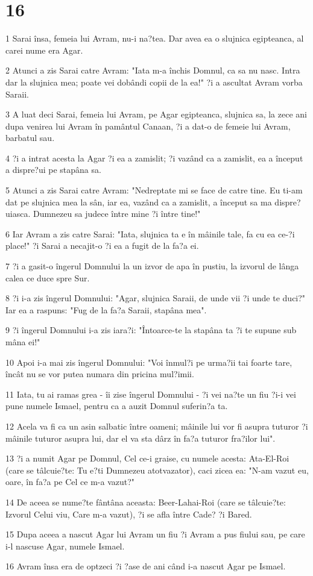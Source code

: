 \chapter{16}

\par 1 Sarai însa, femeia lui Avram, nu-i na?tea. Dar avea ea o slujnica egipteanca, al carei nume era Agar.
\par 2 Atunci a zis Sarai catre Avram: "Iata m-a închis Domnul, ca sa nu nasc. Intra dar la slujnica mea; poate vei dobândi copii de la ea!" ?i a ascultat Avram vorba Saraii.
\par 3 A luat deci Sarai, femeia lui Avram, pe Agar egipteanca, slujnica sa, la zece ani dupa venirea lui Avram în pamântul Canaan, ?i a dat-o de femeie lui Avram, barbatul sau.
\par 4 ?i a intrat acesta la Agar ?i ea a zamislit; ?i vazând ca a zamislit, ea a început a dispre?ui pe stapâna sa.
\par 5 Atunci a zis Sarai catre Avram: "Nedreptate mi se face de catre tine. Eu ti-am dat pe slujnica mea la sân, iar ea, vazând ca a zamislit, a început sa ma dispre?uiasca. Dumnezeu sa judece între mine ?i între tine!"
\par 6 Iar Avram a zis catre Sarai: "Iata, slujnica ta e în mâinile tale, fa cu ea ce-?i place!" ?i Sarai a necajit-o ?i ea a fugit de la fa?a ei.
\par 7 ?i a gasit-o îngerul Domnului la un izvor de apa în pustiu, la izvorul de lânga calea ce duce spre Sur.
\par 8 ?i i-a zis îngerul Domnului: "Agar, slujnica Saraii, de unde vii ?i unde te duci?" Iar ea a raspuns: "Fug de la fa?a Saraii, stapâna mea".
\par 9 ?i îngerul Domnului i-a zis iara?i: "Întoarce-te la stapâna ta ?i te supune sub mâna ei!"
\par 10 Apoi i-a mai zis îngerul Domnului: "Voi înmul?i pe urma?ii tai foarte tare, încât nu se vor putea numara din pricina mul?imii.
\par 11 Iata, tu ai ramas grea - îi zise îngerul Domnului - ?i vei na?te un fiu ?i-i vei pune numele Ismael, pentru ca a auzit Domnul suferin?a ta.
\par 12 Acela va fi ca un asin salbatic între oameni; mâinile lui vor fi asupra tuturor ?i mâinile tuturor asupra lui, dar el va sta dârz în fa?a tuturor fra?ilor lui".
\par 13 ?i a numit Agar pe Domnul, Cel ce-i graise, cu numele acesta: Ata-El-Roi (care se tâlcuie?te: Tu e?ti Dumnezeu atotvazator), caci zicea ea: "N-am vazut eu, oare, în fa?a pe Cel ce m-a vazut?"
\par 14 De aceea se nume?te fântâna aceasta: Beer-Lahai-Roi (care se tâlcuie?te: Izvorul Celui viu, Care m-a vazut), ?i se afla între Cade? ?i Bared.
\par 15 Dupa aceea a nascut Agar lui Avram un fiu ?i Avram a pus fiului sau, pe care i-l nascuse Agar, numele Ismael.
\par 16 Avram însa era de optzeci ?i ?ase de ani când i-a nascut Agar pe Ismael.

